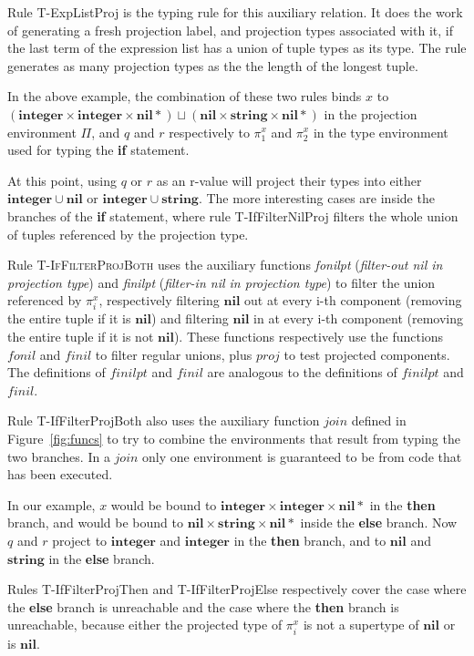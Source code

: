\documentclass[preprint]{sigplanconf}
\newcommand{\Nil}{\mathbf{nil}}
\newcommand{\Integer}{\mathbf{integer}}
\newcommand{\String}{\mathbf{string}}
\begin{document}
Rule {\sc T-ExpListProj} is the typing rule for this auxiliary
relation. It does the work of generating a fresh projection label,
and projection types associated with it, if the last term of
the expression list has a union of tuple types as its type.
The rule generates as many projection types as the the length
of the longest tuple.

In the above example, the combination of these two rules binds $x$ to
$(\Integer \times \Integer \times \Nil{*}) \sqcup (\Nil \times \String \times \Nil{*})$ in the projection environment $\Pi$,
and $q$ and $r$ respectively to $\pi_{1}^{x}$ and $\pi_{2}^{x}$
in the type environment used for typing the {\bf if} statement.

At this point, using $q$ or $r$ as an r-value will project
their types into either $\Integer \cup \Nil$ or $\Integer \cup \String$. The more interesting cases are inside the
branches of the {\bf if} statement, where rule {\sc T-IfFilterNilProj} filters the whole union of tuples referenced
by the projection type.

Rule \textsc{T-IfFilterProjBoth} uses the auxiliary functions \emph{fonilpt} ({\em filter-out nil in projection type}) and \emph{finilpt} ({\em filter-in nil in projection type}) to
filter the union referenced by $\pi_{i}^{x}$, respectively
filtering $\Nil$ out at every i-th component (removing
the entire tuple if it is $\Nil$) and filtering $\Nil$ in at every i-th component (removing the entire tuple if it is not $\Nil$). These functions respectively use the functions $fonil$ and $finil$ to filter regular unions, plus $proj$ to test projected components. The definitions of $finilpt$ and $finil$ are analogous to the definitions of $finilpt$ and $finil$.

Rule {\sc T-IfFilterProjBoth} also uses the auxiliary function $join$ defined in Figure~\ref{fig:funcs} to try to combine the environments that result from typing the two branches. In a $join$ only one environment is guaranteed to be from code that has been executed.

In our example, $x$ would be bound to $\Integer \times \Integer \times \Nil{*}$ in the {\bf then} branch, and would be bound
to $\Nil \times \String \times \Nil{*}$ inside the {\bf else}
branch. Now $q$ and $r$ project to $\Integer$ and $\Integer$
in the {\bf then} branch, and to $\Nil$ and $\String$ in the
{\bf else} branch. 

Rules {\sc T-IfFilterProjThen} and {\sc T-IfFilterProjElse}
respectively cover the case where the {\bf else} branch is unreachable and the case where the {\bf then} branch is unreachable, because either the projected type of $\pi_i^x$
is not a supertype of $\Nil$ or is $\Nil$.
\end{document}

